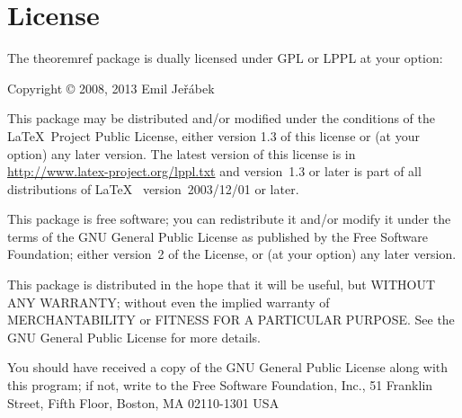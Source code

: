 \documentclass[pagesize=auto]{scrartcl}
\newcommand*{\pkg}[1]{\textsf{#1}}
\begin{document}
\section{License}

The \pkg{theoremref} package is dually licensed under GPL or LPPL at your
option:

Copyright © 2008, 2013 Emil Jeřábek

This package may be distributed and/or modified under the
conditions of the \LaTeX\ Project Public License, either version 1.3
of this license or (at your option) any later version.
The latest version of this license is in
\url{http://www.latex-project.org/lppl.txt}
and version~1.3 or later is part of all distributions of \LaTeX\ %
version~2003/12/01 or later.

This package is free software; you can redistribute it and/or modify
it under the terms of the GNU General Public License as published by
the Free Software Foundation; either version~2 of the License, or
(at your option) any later version.

This package is distributed in the hope that it will be useful,
but WITHOUT ANY WARRANTY; without even the implied warranty of
MERCHANTABILITY or FITNESS FOR A PARTICULAR PURPOSE.  See the
GNU General Public License for more details.

You should have received a copy of the GNU General Public License
along with this program; if not, write to the Free Software
Foundation, Inc., 51 Franklin Street, Fifth Floor, Boston, MA  02110-1301  USA
\end{document}

